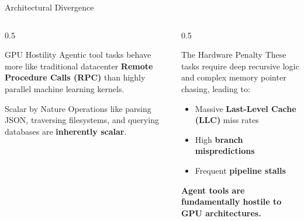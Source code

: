 \documentclass[aspectratio=169, 10pt]{beamer}
\begin{document}
\begin{frame}{Architectural Divergence}
  \begin{columns}
    \begin{column}{0.5\textwidth}
      \begin{block}{GPU Hostility}
        Agentic tool tasks behave more like traditional datacenter \textbf{Remote Procedure Calls (RPC)} than highly parallel machine learning kernels.
      \end{block}
      \vspace{0.3em}
      \begin{block}{Scalar by Nature}
        Operations like parsing JSON, traversing filesystems, and querying databases are \textbf{inherently scalar}.
      \end{block}
    \end{column}
    \begin{column}{0.5\textwidth}
      \begin{alertblock}{The Hardware Penalty}
        These tasks require deep recursive logic and complex memory pointer chasing, leading to:
        \begin{itemize}
          \item Massive \textbf{Last-Level Cache (LLC)} miss rates
          \item High \textbf{branch mispredictions}
          \item Frequent \textbf{pipeline stalls}
        \end{itemize}
      \end{alertblock}
      \vspace{0.3em}
      \begin{center}
        \textcolor{neonmint}{\textbf{Agent tools are fundamentally hostile to GPU architectures.}}
      \end{center}
    \end{column}
  \end{columns}
\end{frame}
\end{document}
